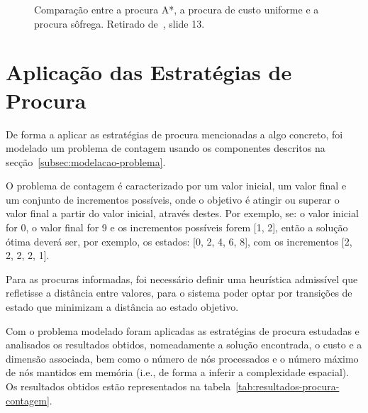 \begin{figure}[H]
    \begin{center}
    \end{center}
    \caption{Comparação entre a procura A*, a procura de custo uniforme e a procura sôfrega.
    Retirado de~\cite{isel:iasa:slides:proc-espaco-estados-parte-3}, slide 13.}
    \label{fig:comp-metodos-proc}
\end{figure}


\section{Aplicação das Estratégias de Procura}\label{sec:aplicacao-estrategias-procura}

De forma a aplicar as estratégias de procura mencionadas a algo concreto, foi modelado um problema de contagem usando os componentes descritos na secção~\ref{subsec:modelacao-problema}.

O problema de contagem é caracterizado por um valor inicial, um valor final e um conjunto de incrementos possíveis,
onde o objetivo é atingir ou superar o valor final a partir do valor inicial, através destes.
Por exemplo, se: o valor inicial for 0, o valor final for 9 e os incrementos possíveis forem [1, 2], então a solução ótima deverá ser, por exemplo, os estados: [0, 2, 4, 6, 8], com os incrementos [2, 2, 2, 2, 1].

Para as procuras informadas, foi necessário definir uma heurística admissível que refletisse a distância entre valores, para o sistema
poder optar por transições de estado que minimizam a distância ao estado objetivo.

Com o problema modelado foram aplicadas as estratégias de procura estudadas e analisados os resultados obtidos,
nomeadamente a solução encontrada, o custo e a dimensão associada, bem como o número de nós processados e o número máximo de nós mantidos em memória (i.e., de forma a inferir a complexidade espacial).
Os resultados obtidos estão representados na tabela~\ref{tab:resultados-procura-contagem}.

